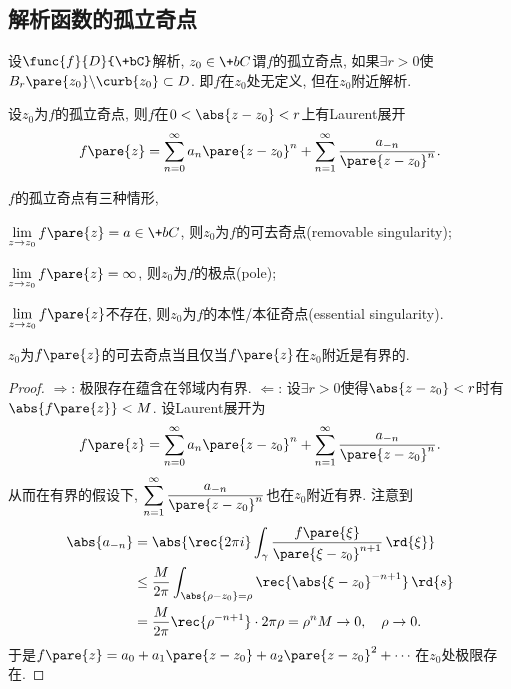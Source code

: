 \documentclass[../ComplexVariable.tex]{subfiles}
\begin{document}
\subsection{解析函数的孤立奇点} %
\label{sub:解析函数的孤立奇点}

\begin{definition}
    设$\func{f}{D}{\+bC}$解析, $z_0\in \+bC$谓$f$的孤立奇点, 如果$\exists r>0$使$B_r\pare{z_0}\backslash \curb{z_0}\subset D$. 即$f$在$z_0$处无定义, 但在$z_0$附近解析.
\end{definition}
设$z_0$为$f$的孤立奇点, 则$f$在$0 < \abs{z-z_0} < r$上有Laurent展开
\[ f\pare{z} = \sum_{n=0}^\infty a_n \pare{z-z_0}^n + \sum_{n=1}^\infty \frac{a_{-n}}{\pare{z-z_0}^n}. \]
\begin{definition}
    $f$的孤立奇点有三种情形,
    \begin{cenum}
        \item $\displaystyle \lim_{z\rightarrow z_0}f\pare{z} = a\in \+bC$, 则$z_0$为$f$的可去奇点(removable singularity);
        \item $\displaystyle \lim_{z\rightarrow z_0}f\pare{z} = \infty$, 则$z_0$为$f$的极点(pole);
        \item $\displaystyle \lim_{z\rightarrow z_0}f\pare{z}$不存在, 则$z_0$为$f$的本性/本征奇点(essential singularity).
    \end{cenum}
\end{definition}
\begin{theorem}[Riemann]
    $z_0$为$f\pare{z}$的可去奇点当且仅当$f\pare{z}$在$z_0$附近是有界的.
\end{theorem}
\begin{proof}
    $\Rightarrow$: 极限存在蕴含在邻域内有界. $\Leftarrow$: 设$\exists r>0$使得$\abs{z-z_0}<r$时有$\abs{f\pare{z}}<M$. 设Laurent展开为
    \[ f\pare{z} = \sum_{n=0}^\infty a_n \pare{z-z_0}^n + \sum_{n=1}^\infty \frac{a_{-n}}{\pare{z-z_0}^{n}}. \]
    从而在有界的假设下, $\displaystyle \sum_{n=1}^\infty \frac{a_{-n}}{\pare{z-z_0}^{n}}$也在$z_0$附近有界. 注意到
    \begin{align*}
        \abs{a_{-n}} &= \abs{\rec{2\pi i} \int_\gamma \frac{f\pare{\xi}}{\pare{\xi-z_0}^{n+1}}\,\rd{\xi}} \\
        &\le \frac{M}{2\pi} \int_{\abs{\rho - z_0}=\rho} \rec{\abs{\xi - z_0}^{-n+1}}\,\rd{s} \\
        &= \frac{M}{2\pi} \rec{\rho^{-n+1}}\cdot 2\pi \rho = \rho^nM \rightarrow 0,\quad \rho\rightarrow 0.
    \end{align*}
    于是$\displaystyle f\pare{z} = a_0 + a_1\pare{z-z_0} + a_2\pare{z-z_0}^2 + \cdots$在$z_0$处极限存在.
\end{proof}
\end{document}

